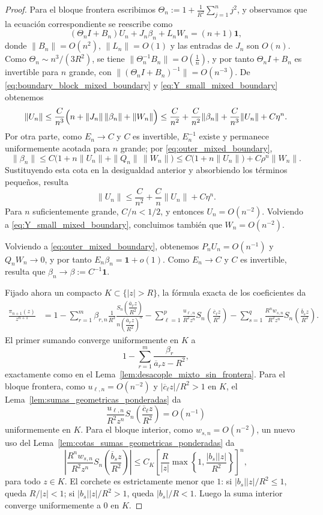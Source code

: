 \begin{proof}
	Para el bloque frontera escribimos $\Theta_n:=1+\frac1{R^2}\sum_{j=1}^n j^2$,
	y observamos que la ecuación correspondiente se reescribe como
	\begin{equation}\label{eq:boundary_block_mixed_boundary}
		(\Theta_n I+B_n)U_n+J_n\beta_n+L_nW_n=(n+1)\mathbf 1,
	\end{equation}
	donde $\|B_n\|=O(n^2)$, $\|L_n\|=O(1)$ y las entradas de $J_n$ son $O(n)$. Como $\Theta_n\sim n^3/(3R^2)$, se tiene $\|\Theta_n^{-1}B_n\|=O\!\left(\frac1n\right)$, y por tanto $\Theta_n I+B_n$ es invertible para $n$ grande, con $\|(\Theta_n I+B_n)^{-1}\|=O(n^{-3})$.
	De \eqref{eq:boundary_block_mixed_boundary} y \eqref{eq:Y_small_mixed_boundary} obtenemos
	\[
		\|U_n\|\le \frac{C}{n^3}\Bigl(n+\|J_n\|\,\|\beta_n\|+\|W_n\|\Bigr)
		\le \frac{C}{n^2}+\frac{C}{n^2}\|\beta_n\|+\frac{C}{n^3}\|U_n\|+C\eta^n.
	\]
	Por otra parte, como $E_n\to C$ y $C$ es invertible, $E_n^{-1}$ existe y permanece uniformemente acotada para $n$ grande; por \eqref{eq:outer_mixed_boundary},
	\[
		\|\beta_n\|\le C\bigl(1+n\|U_n\|+\|Q_n\|\,\|W_n\|\bigr)
		\le C\bigl(1+n\|U_n\|\bigr)+C\rho^n\|W_n\|.
	\]
	Sustituyendo esta cota en la desigualdad anterior y absorbiendo los términos pequeños, resulta
	\[
		\|U_n\|\le \frac{C}{n^2}+\frac{C}{n}\|U_n\|+C\eta^n.
	\]
	Para $n$ suficientemente grande, $C/n<1/2$, y entonces $U_n=O(n^{-2})$. Volviendo a \eqref{eq:Y_small_mixed_boundary}, concluimos también que $W_n=O(n^{-2})$.

	Volviendo a \eqref{eq:outer_mixed_boundary}, obtenemos $P_nU_n=O(n^{-1})$ y $Q_nW_n\longrightarrow0$, y por tanto $E_n\beta_n=\mathbf 1+o(1)$. Como $E_n\to C$ y $C$ es invertible, resulta que $\beta_n\longrightarrow\beta:=C^{-1}\mathbf 1$.

	Fijado ahora un compacto $K\subset\{|z|>R\}$, la fórmula exacta de los coeficientes da
	\begin{align*}
		\frac{\pi_{n+1}(z)}{z^{n+1}}
		 & =1
		-\sum_{r=1}^m \beta_{r,n}\frac1{R^2}\frac{S_n\!\left(\dfrac{\overline a_r z}{R^2}\right)}{n\left(\dfrac{\overline a_r z}{R^2}\right)^n}
		-\sum_{\ell=1}^p \frac{u_{\ell,n}}{R^2z^n}S_n\!\left(\frac{\overline c_\ell z}{R^2}\right)
		-\sum_{s=1}^q \frac{R^n w_{s,n}}{R^2z^n}S_n\!\left(\frac{\overline b_s z}{R^2}\right).
	\end{align*}
	El primer sumando converge uniformemente en $K$ a
	\[
		1-\sum_{r=1}^m\frac{\beta_r}{\overline a_r z-R^2},
	\]
	exactamente como en el Lema~\ref{lem:desacople_mixto_sin_frontera}. Para el bloque frontera, como $u_{\ell,n}=O(n^{-2})$ y $|\overline c_\ell z|/R^2>1$ en $K$, el Lema~\ref{lem:sumas_geometricas_ponderadas} da
	\[
		\frac{u_{\ell,n}}{R^2z^n}S_n\!\left(\frac{\overline c_\ell z}{R^2}\right)=O(n^{-1})
	\]
	uniformemente en $K$. Para el bloque interior, como $w_{s,n}=O(n^{-2})$, un nuevo uso del Lema~\ref{lem:cotas_sumas_geometricas_ponderadas} da
	\[
		\left|\frac{R^n w_{s,n}}{R^2z^n}S_n\!\left(\frac{\overline b_s z}{R^2}\right)\right|
		\le C_K\left[\frac{R}{|z|}\max\!\left\{1,\frac{|b_s||z|}{R^2}\right\}\right]^n,
	\]
	para todo $z\in K$. El corchete es estrictamente menor que $1$: si $|b_s||z|/R^2\le1$, queda $R/|z|<1$; si $|b_s||z|/R^2>1$, queda $|b_s|/R<1$. Luego la suma interior converge uniformemente a $0$ en $K$.


\end{proof}
